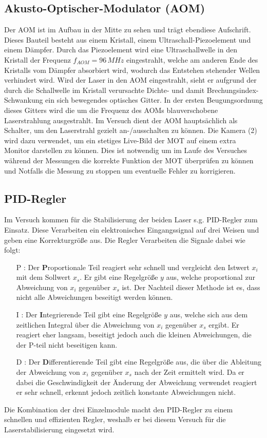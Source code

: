 \documentclass[twoside,colorback,accentcolor=tud4c,11pt]{tudreport}
\begin{document}
\subsection{Akusto-Optischer-Modulator (AOM)}
Der AOM ist im Aufbau in der Mitte zu sehen und trägt ebendiese Aufschrift. Dieses Bauteil besteht aus einem Kristall, einem Ultraschall-Piezoelement und einem Dämpfer. Durch das Piezoelement wird eine Ultraschallwelle in den Kristall der Frequenz $f_{AOM}=96\,\si{MHz}$ eingestrahlt, welche am anderen Ende des Kristalls vom Dämpfer absorbiert wird, wodurch das Entstehen stehender Wellen verhindert wird. Wird der Laser in den AOM eingestrahlt, sieht er aufgrund der durch die Schallwelle im Kristall verursachte Dichte- und damit Brechungsindex-Schwankung ein sich bewegendes optisches Gitter. In der ersten Beugungsordnung dieses Gitters wird die um die Frequenz des AOMs blauverschobene Laserstrahlung ausgestrahlt. Im Versuch dient der AOM hauptsächlich als Schalter, um den Laserstrahl gezielt an-/ausschalten zu können.
Die Kamera (2) wird dazu verwendet, um ein stetiges Live-Bild der MOT auf einem extra Monitor darstellen zu können. Dies ist notwendig um im Laufe des Versuches während der Messungen die korrekte Funktion der MOT überprüfen zu können und Notfalls die Messung zu stoppen um eventuelle Fehler zu korrigieren.
\subsection{PID-Regler}
Im Versuch kommen für die Stabilisierung der beiden Laser s.g. PID-Regler zum Einsatz. Diese Verarbeiten ein elektronisches Eingangssignal auf drei Weisen und geben eine Korrekturgröße aus. Die Regler Verarbeiten die Signale dabei wie folgt:
\begin{itemize}
\item[P]: Der $\textbf{P}$roportionale Teil reagiert sehr schnell und vergleicht den Istwert $x_i$ mit dem Sollwert $x_s$. Er gibt eine Regelgröße $y$ aus, welche proportional zur Abweichung von $x_i$ gegenüber $x_s$ ist. Der Nachteil dieser Methode ist es, dass nicht alle Abweichungen beseitigt werden können.
\item[I]: Der $\textbf{I}$ntegrierende Teil gibt eine Regelgröße $y$ aus, welche sich aus dem zeitlichen Integral über die Abweichung von $x_i$ gegenüber $x_s$ ergibt. Er reagiert eher langsam, beseitigt jedoch auch die kleinen Abweichungen, die der P-teil nicht beseitigen kann.
\item[D]: Der $\textbf{D}$ifferentierende Teil gibt eine Regelgröße aus, die über die Ableitung der Abweichung von $x_i$ gegenüber $x_s$ nach der Zeit ermittelt wird. Da er dabei die Geschwindigkeit der Änderung der Abweichung verwendet reagiert er sehr schnell, erkennt jedoch zeitlich konstante Abweichungen nicht.
\end{itemize}
Die Kombination der drei Einzelmodule macht den PID-Regler zu einem schnellen und effizienten Regler, weshalb er bei diesem Versuch für die Laserstabilisierung eingesetzt wird.
\end{document}

